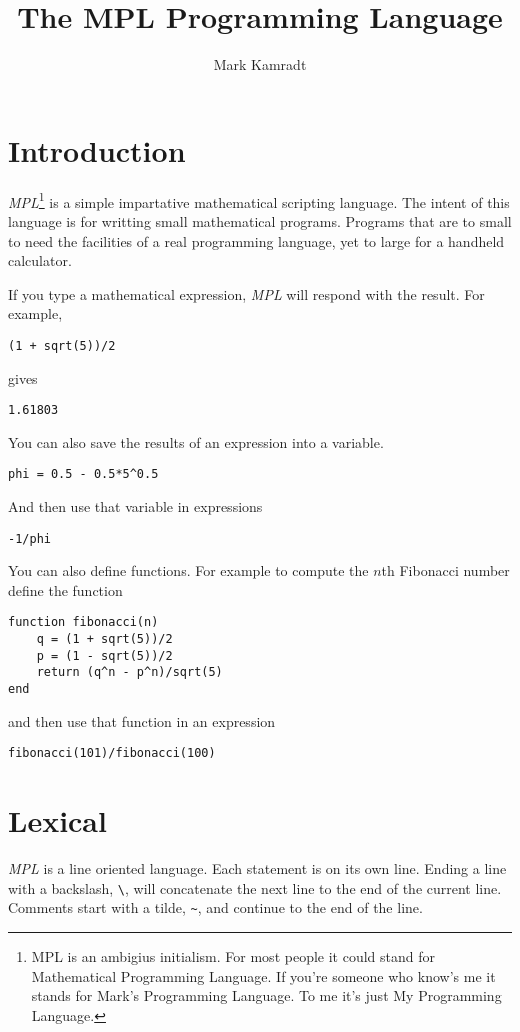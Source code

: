 \documentclass{article}
\begin{document}
\title{The MPL Programming Language}
\author{Mark Kamradt}
\maketitle
\section{Introduction}
\emph{MPL}\footnote{MPL is an ambigius initialism.
  For most people it could stand for Mathematical Programming Language.
  If you're someone who know's me it stands for Mark's Programming Language.
  To me it's just My Programming Language.}
is a simple impartative mathematical scripting language.
The intent of this language is for writting small mathematical programs.
Programs that are to small to need the facilities of a real programming
language, yet to large for a handheld calculator.

If you type a mathematical expression, \emph{MPL} will respond with
the result.  For example,
\begin{verbatim}
(1 + sqrt(5))/2
\end{verbatim}
gives
\begin{verbatim}
1.61803
\end{verbatim}

You can also save the results of an expression into a variable.
\begin{verbatim}
phi = 0.5 - 0.5*5^0.5
\end{verbatim}
And then use that variable in expressions
\begin{verbatim}
-1/phi
\end{verbatim}

You can also define functions. For example to compute the $n$th Fibonacci
number define the function
\begin{verbatim}
function fibonacci(n)
    q = (1 + sqrt(5))/2
    p = (1 - sqrt(5))/2
    return (q^n - p^n)/sqrt(5)
end
\end{verbatim}
and then use that function in an expression
\begin{verbatim}
fibonacci(101)/fibonacci(100)
\end{verbatim}
\section{Lexical}
\emph{MPL} is a line oriented language.
Each statement is on its own line.
Ending a line with a backslash, \verb|\|, will concatenate the next line
to the end of the current line.
Comments start with a tilde, \verb|~|, and continue to the end of the line.
\end{document}
